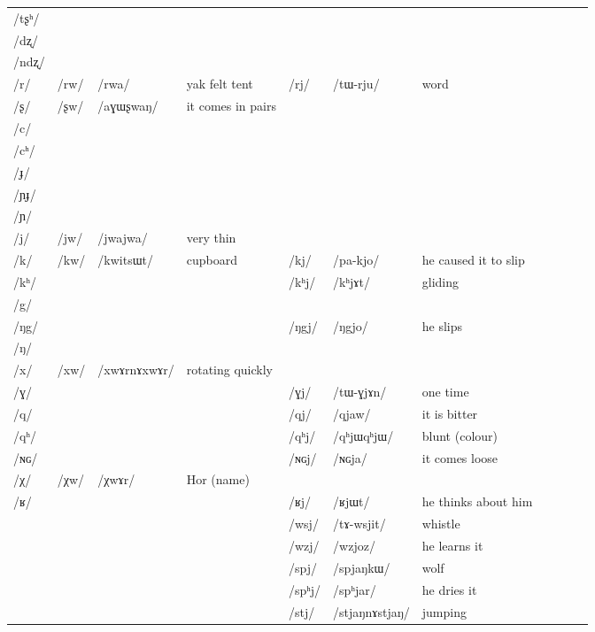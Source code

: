 \documentclass[oldfontcommands,oneside,a4paper,11pt]{article}
\newcommand{\ipa}[1]{\mbox{/#1/}} %
\newcommand{\deux}[1]{/#1/}
\newcommand{\trois}[1]{/#1/}
\newcommand{\tib}[1]{\cellcolor{lightgray}\textbf{#1}}
\newcommand{\idph}[1]{\cellcolor{gray}\textbf{#1}}
\begin{document}
\begin{landscape}
\begin{longtable}{l|lll|lll|lll|l}
\ipa{tʂʰ} 	& 	& 	&	& 	& 	&\\	
\ipa{dʐ} 	& 	& 	&	& 	& 	&\\	
\ipa{ndʐ} 	& 	& 	&	& 	& 	&\\	
\ipa{r} 	&\deux{rw}\tib{} 	&\ipa{rwa} 	&yak felt tent	&\deux{rj} 	&\ipa{tɯ-rju} 	&word \\	
\ipa{ʂ} 	&\deux{ʂw} \tib{}	&\ipa{aɣɯʂwaŋ} 	&it comes in pairs	& 	& 	&\\	
\ipa{c} 	& 	& 	&	& 	& 	&\\	
\ipa{cʰ} 	& 	& 	&	& 	& 	&\\	
\ipa{ɟ} 	& 	& 	&	& 	& 	&\\	
\ipa{ɲɟ} 	& 	& 	&	& 	& 	&\\	
\ipa{ɲ} 	& 	& 	&	& 	& 	&\\	
\ipa{j} 	&\deux{jw} 	&\ipa{jwajwa} 	&very thin	& 	& 	&\\	
\ipa{k} 	&\deux{kw}\tib{} 	&\ipa{kwitsɯt} 	&cupboard	&\deux{kj} 	&\ipa{pa-kjo} 	&he caused it to slip\\	
\ipa{kʰ} 	&  	& 	&	&  	\deux{kʰj} \idph{}& \ipa{kʰjɤt} 	& gliding\\	
\ipa{g} 	& 	& 	&	& 	& 	&\\	
\ipa{ŋg} 	& 	& 	&	&\deux{ŋgj} 	&\ipa{ŋgjo} 	&he slips\\	
\ipa{ŋ} 	& 	& 	&	& 	& 	&\\	
\ipa{x} 	&\deux{xw}\idph{} 	& 	\ipa{xwɤrnɤxwɤr}& rotating quickly	& 	& 	&\\	
\ipa{ɣ} 	& 	& 	&	&\deux{ɣj} 	&\ipa{tɯ-ɣjɤn} 	&one time\\	
\ipa{q} 	& 	& 	&	&\deux{qj} 	&\ipa{qjaw} 	&it is bitter\\	
\ipa{qʰ} 	& 	& 	&	&\deux{qʰj} \idph{}	&\ipa{qʰjɯqʰjɯ} 	&blunt (colour)\\	
\ipa{ɴɢ} 	& 	& 	&	&\deux{ɴɢj} 	&\ipa{ɴɢja} 	&it comes loose\\	
\ipa{χ} 	&\deux{χw} \tib{}	&\ipa{χwɤr} 	&Hor (name)	& 	& 	&\\	
\ipa{ʁ} 	& 	& 	&	&\deux{ʁj} 	&\ipa{ʁjɯt} 	&he thinks about 	
him\\
\midrule
 		& 		&		&		&\trois{wsj} 		&\ipa{tɤ-wsjit} 		&whistle\\
 		& 		&		&		&\trois{wzj}  \tib{}		&\ipa{wzjoz}  		&he learns it\\
\midrule												
 		& 		&		&		&\trois{spj} 		&\ipa{spjaŋkɯ} 		&wolf\\
 		& 		&		&		&\trois{spʰj} 		&\ipa{spʰjar} 		& he dries it\\
 		 		& 		&		&		&\trois{stj}  \idph{}		&\ipa{stjaŋnɤstjaŋ} 		&jumping \\

\end{longtable}
\end{landscape}
\end{document}
